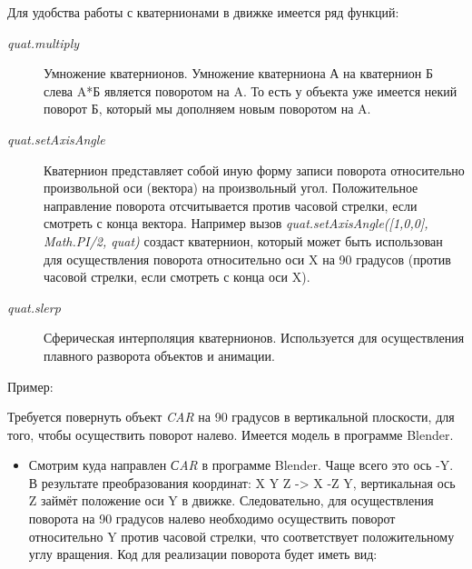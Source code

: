 \documentclass[a4paper,12pt,oneside]{sphinxmanual}
\begin{document}
Для удобства работы с кватернионами в движке имеется ряд функций:
\begin{description}
\item[{\emph{quat.multiply}}] \leavevmode
Умножение кватернионов. Умножение кватерниона А на кватернион Б слева A*Б является поворотом на A. То есть у объекта уже имеется некий поворот Б, который мы дополняем новым поворотом на A.

\item[{\emph{quat.setAxisAngle}}] \leavevmode
Кватернион представляет собой иную форму записи поворота относительно произвольной оси (вектора) на произвольный угол. Положительное направление поворота отсчитывается против часовой стрелки, если смотреть с конца вектора. Например вызов \emph{quat.setAxisAngle({[}1,0,0{]}, Math.PI/2, quat)} создаст кватернион, который может быть использован для осуществления поворота относительно оси X на 90 градусов (против часовой стрелки, если смотреть с конца оси X).

\item[{\emph{quat.slerp}}] \leavevmode
Сферическая интерполяция кватернионов. Используется для осуществления плавного разворота объектов и анимации.

\end{description}

Пример:

Требуется повернуть объект \emph{CAR} на 90 градусов в вертикальной плоскости, для того, чтобы осуществить поворот налево. Имеется модель в программе Blender.
\begin{itemize}
\item {} 
Смотрим куда направлен \emph{СAR} в программе Blender. Чаще всего это ось -Y. В результате преобразования координат: X Y Z -\textgreater{} X -Z Y, вертикальная ось Z займёт положение оси Y в движке. Следовательно, для осуществления поворота на 90 градусов налево необходимо осуществить поворот относительно Y против часовой стрелки, что соответствует положительному углу вращения. Код для реализации поворота будет иметь вид:

\end{itemize}
\end{document}
